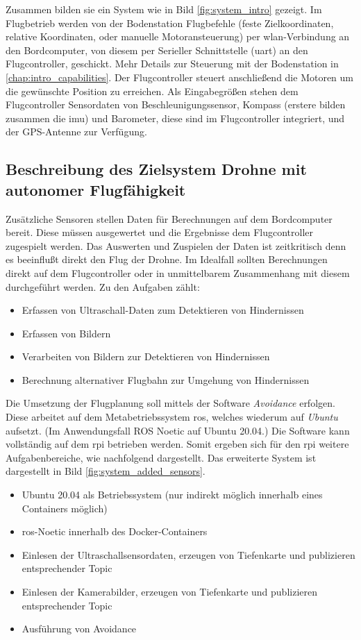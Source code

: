 Zusammen bilden sie ein System wie in Bild \ref{fig:system_intro} gezeigt. Im Flugbetrieb werden von der Bodenstation Flugbefehle (feste Zielkoordinaten, relative Koordinaten, oder manuelle Motoransteuerung) per \acrshort{wlan}-Verbindung an den Bordcomputer, von diesem per Serieller Schnittstelle (\acrshort{uart}) an den Flugcontroller, geschickt. Mehr Details zur Steuerung mit der Bodenstation in \cref{chap:intro_capabilities}. Der Flugcontroller steuert anschließend die Motoren um die gewünschte Position zu erreichen. Als Eingabegrößen stehen dem Flugcontroller Sensordaten von Beschleunigungssensor, Kompass (erstere bilden zusammen die \gls{imu}) und Barometer, diese sind im Flugcontroller integriert, und der GPS-Antenne zur Verfügung.

\subsection{Beschreibung des Zielsystem Drohne mit autonomer Flugfähigkeit}
Zusätzliche Sensoren stellen Daten für Berechnungen auf dem Bordcomputer bereit. Diese müssen ausgewertet und die Ergebnisse dem Flugcontroller zugespielt werden. Das Auswerten und Zuspielen der Daten ist zeitkritisch denn es beeinflußt direkt den Flug der Drohne. Im Idealfall sollten Berechnungen direkt auf dem Flugcontroller oder in unmittelbarem Zusammenhang mit diesem durchgeführt werden. Zu den Aufgaben zählt:
\begin{itemize}
    \item Erfassen von Ultraschall-Daten zum Detektieren von Hindernissen
    \item Erfassen von Bildern
    \item Verarbeiten von Bildern zur Detektieren von Hindernissen
    \item Berechnung alternativer Flugbahn zur Umgehung von Hindernissen
\end{itemize}

Die Umsetzung der Flugplanung soll mittels der Software \textit{Avoidance} erfolgen. Diese arbeitet auf dem Metabetriebssystem \acrshort{ros}, welches wiederum auf \textit{Ubuntu} aufsetzt. (Im Anwendungsfall ROS Noetic auf Ubuntu 20.04.) Die Software kann vollständig auf dem \gls{rpi} betrieben werden. Somit ergeben sich für den \gls{rpi} weitere Aufgabenbereiche, wie nachfolgend dargestellt. Das erweiterte System ist dargestellt in Bild \ref{fig:system_added_sensors}.

\begin{itemize}
    \item Ubuntu 20.04 als Betriebssystem (nur indirekt möglich innerhalb eines Containers möglich)
    \item \acrshort{ros}-Noetic innerhalb des Docker-Containers
    \item Einlesen der Ultraschallsensordaten, erzeugen von Tiefenkarte und publizieren entsprechender Topic
    \item Einlesen der Kamerabilder, erzeugen von Tiefenkarte und publizieren entsprechender Topic
    \item Ausführung von Avoidance
\end{itemize}

